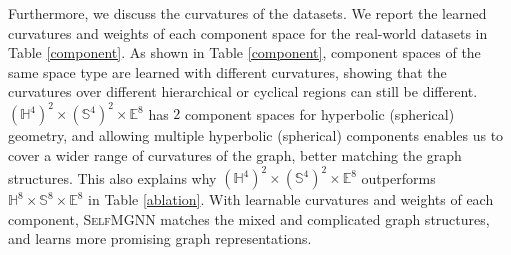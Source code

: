 Furthermore, we discuss the curvatures of the datasets. 
We report the learned curvatures and weights of each component space for the real-world datasets in Table \ref{component}.
As shown in Table \ref{component}, component spaces of the same space type are learned with different curvatures, showing that the curvatures over different hierarchical or cyclical regions can still be different.
$(\mathbb H^4)^2\times (\mathbb S^4)^2\times\mathbb E^8$ has $2$ component spaces for hyperbolic (spherical) geometry, 
and allowing multiple hyperbolic (spherical) components enables us to cover a wider range of curvatures of the graph, better matching the graph structures.
This also explains why $(\mathbb H^4)^2\times (\mathbb S^4)^2\times\mathbb E^8$ outperforms  $\mathbb H^8 \times\mathbb S^8\times\mathbb E^8$ in Table \ref{ablation}.
With learnable curvatures and weights of each component, \textsc{SelfMGNN} matches the mixed and complicated graph structures, and learns more promising graph representations. 






